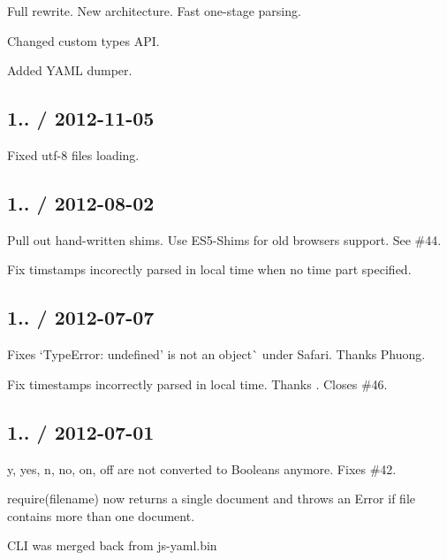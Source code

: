 \begin{DoxyItemize}
\item Full rewrite. New architecture. Fast one-\/stage parsing.
\item Changed custom types A\+PI.
\item Added Y\+A\+ML dumper.
\end{DoxyItemize}

\subsection*{1.. / 2012-\/11-\/05 }


\begin{DoxyItemize}
\item Fixed utf-\/8 files loading.
\end{DoxyItemize}

\subsection*{1.. / 2012-\/08-\/02 }


\begin{DoxyItemize}
\item Pull out hand-\/written shims. Use E\+S5-\/\+Shims for old browsers support. See \#44.
\item Fix timstamps incorectly parsed in local time when no time part specified.
\end{DoxyItemize}

\subsection*{1.. / 2012-\/07-\/07 }


\begin{DoxyItemize}
\item Fixes `Type\+Error\+: \textquotesingle{}undefined' is not an object\`{} under Safari. Thanks Phuong.
\item Fix timestamps incorrectly parsed in local time. Thanks . Closes \#46.
\end{DoxyItemize}

\subsection*{1.. / 2012-\/07-\/01 }


\begin{DoxyItemize}
\item {\ttfamily y}, {\ttfamily yes}, {\ttfamily n}, {\ttfamily no}, {\ttfamily on}, {\ttfamily off} are not converted to Booleans anymore. Fixes \#42.
\item {\ttfamily require(filename)} now returns a single document and throws an Error if file contains more than one document.
\item C\+LI was merged back from js-\/yaml.\+bin
\end{DoxyItemize}

